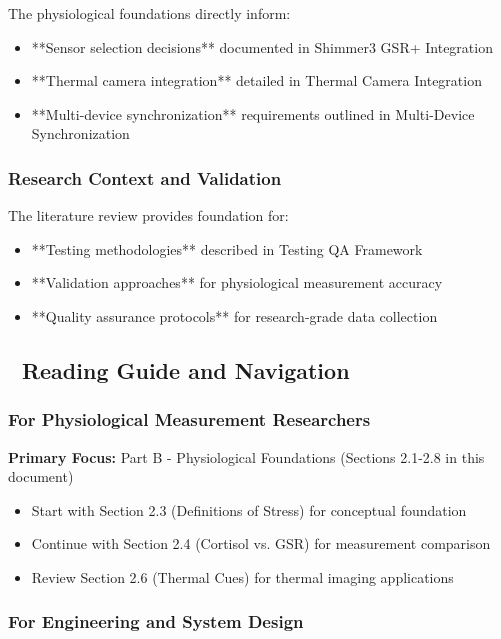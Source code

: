 \documentclass[12pt,a4paper]{article}
\begin{document}
The physiological foundations directly inform:

\begin{itemize}
\item **Sensor selection decisions** documented
  in Shimmer3 GSR+ Integration
\item **Thermal camera integration** detailed
  in Thermal Camera Integration
\item **Multi-device synchronization** requirements outlined
  in Multi-Device Synchronization

\end{itemize}
\subsubsection{Research Context and Validation}

The literature review provides foundation for:

\begin{itemize}
\item **Testing methodologies** described in Testing QA Framework
\item **Validation approaches** for physiological measurement accuracy
\item **Quality assurance protocols** for research-grade data collection

\end{itemize}
\subsection{📖 Reading Guide and Navigation}

\subsubsection{For Physiological Measurement Researchers}

\textbf{Primary Focus:} Part B - Physiological Foundations (Sections 2.1-2.8 in this document)

\begin{itemize}
\item Start with Section 2.3 (Definitions of Stress) for conceptual foundation
\item Continue with Section 2.4 (Cortisol vs. GSR) for measurement comparison
\item Review Section 2.6 (Thermal Cues) for thermal imaging applications

\end{itemize}
\subsubsection{For Engineering and System Design}
\end{document}
